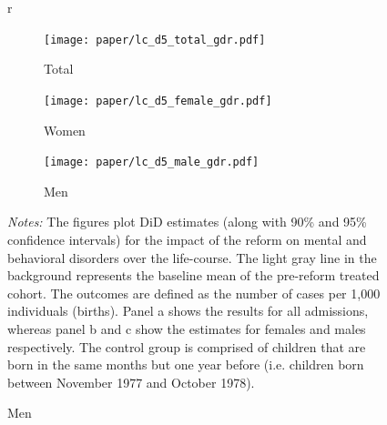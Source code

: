 \documentclass[11pt, a4paper]{article} %
\begin{document}
\begin{landscape}
	\vspace*{\fill}
	\begin{figure}[H]\centering
		\caption{Life-course approach for \textbf{mental and behavioral disorders}}\label{fig: lc_d5_frg_DD}r	\begin{subfigure}[h]{0.31\linewidth}\centering\caption{Total}
			\texttt{[image: paper/lc\_d5\_total\_gdr.pdf]}
		\end{subfigure}
		\begin{subfigure}[h]{0.31\linewidth}\centering\caption{Women}
			\texttt{[image: paper/lc\_d5\_female\_gdr.pdf]}
		\end{subfigure}
		\quad
		\begin{subfigure}[h]{0.31\linewidth}\centering\caption{Men}
			\texttt{[image: paper/lc\_d5\_male\_gdr.pdf]}
		\end{subfigure}
		\scriptsize
		\begin{minipage}{\linewidth}
			\emph{Notes:} The figures plot DiD estimates (along with 90\% and 95\% confidence intervals) for the impact of the reform on mental and behavioral disorders over the life-course. The light gray line in the background represents the baseline mean of the pre-reform treated cohort. The outcomes are defined as the number of cases per 1,000 individuals (births). Panel a shows the results for all admissions, whereas panel b and c show the estimates for females and males respectively. The control group is comprised of children	that are born in the same months but one year before (i.e. children born between November 1977 and October 1978).
		\end{minipage}
	\end{figure}
	\vspace*{\fill}\clearpage
\end{landscape}

%
\end{document}

